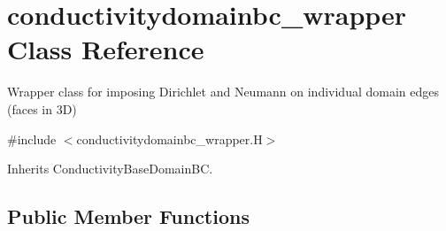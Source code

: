 \hypertarget{classconductivitydomainbc__wrapper}{}\section{conductivitydomainbc\+\_\+wrapper Class Reference}
\label{classconductivitydomainbc__wrapper}


Wrapper class for imposing Dirichlet and Neumann on individual domain edges (faces in 3D)  




{\ttfamily \#include $<$conductivitydomainbc\+\_\+wrapper.\+H$>$}



Inherits Conductivity\+Base\+Domain\+BC.

\subsection*{Public Member Functions}
